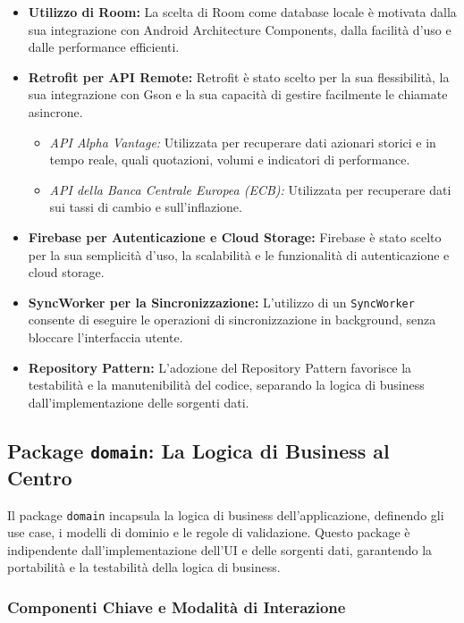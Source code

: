 \documentclass{article}
\begin{document}
\begin{itemize}
    \item \textbf{Utilizzo di Room:} La scelta di Room come database locale è motivata dalla sua integrazione con Android Architecture Components, dalla facilità d'uso e dalle performance efficienti.
    \item \textbf{Retrofit per API Remote:} Retrofit è stato scelto per la sua flessibilità, la sua integrazione con Gson e la sua capacità di gestire facilmente le chiamate asincrone.
        \begin{itemize}
            \item \textit{API Alpha Vantage:} Utilizzata per recuperare dati azionari storici e in tempo reale, quali quotazioni, volumi e indicatori di performance.
            \item \textit{API della Banca Centrale Europea (ECB):} Utilizzata per recuperare dati sui tassi di cambio e sull'inflazione.
        \end{itemize}
    \item \textbf{Firebase per Autenticazione e Cloud Storage:} Firebase è stato scelto per la sua semplicità d'uso, la scalabilità e le funzionalità di autenticazione e cloud storage.
    \item \textbf{SyncWorker per la Sincronizzazione:} L'utilizzo di un \texttt{SyncWorker} consente di eseguire le operazioni di sincronizzazione in background, senza bloccare l'interfaccia utente.
    \item \textbf{Repository Pattern:} L'adozione del Repository Pattern favorisce la testabilità e la manutenibilità del codice, separando la logica di business dall'implementazione delle sorgenti dati.
\end{itemize}

\subsection{Package \texttt{domain}: La Logica di Business al Centro}

Il package \texttt{domain} incapsula la logica di business dell'applicazione, definendo gli use case, i modelli di dominio e le regole di validazione. Questo package è indipendente dall'implementazione dell'UI e delle sorgenti dati, garantendo la portabilità e la testabilità della logica di business.

\subsubsection{Componenti Chiave e Modalità di Interazione}
\end{document}
